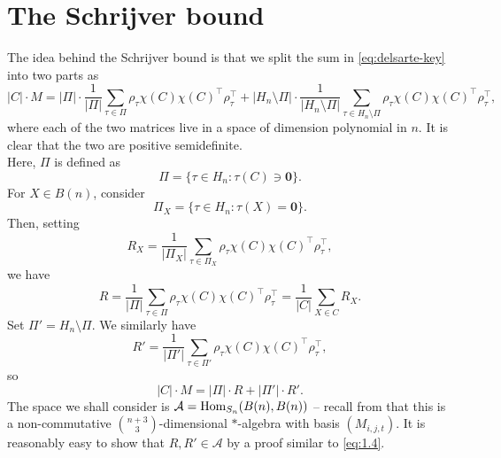\clearpage
\section{The Schrijver bound}
\label{subsec:schrijver}

	The idea behind the Schrijver bound is that we split the sum in \cref{eq:delsarte-key} into two parts as 
	\[ |C| \cdot M = |\Pi| \cdot \frac{1}{|\Pi|} \sum_{\tau \in \Pi} \rho_\tau \chi(C) \chi(C)^\top \rho_\tau^\top + |H_n \setminus \Pi| \cdot \frac{1}{|H_n \setminus \Pi|} \sum_{\tau \in H_n \setminus \Pi} \rho_\tau \chi(C) \chi(C)^\top \rho_\tau^\top, \]
	where each of the two matrices live in a space of dimension polynomial in $n$. It is clear that the two are positive semidefinite.\\
	Here, $\Pi$ is defined as
	\[ \Pi = \{ \tau \in H_n : \tau(C) \ni \mathbf{0} \}. \]
	For $X \in B(n)$, consider
	\[ \Pi_X = \{ \tau \in H_n : \tau(X) = \mathbf{0} \}. \]
	Then, setting 
	\[ R_X = \frac{1}{|\Pi_X|} \sum_{\tau \in \Pi_X} \rho_{\tau} \chi(C) \chi(C)^\top \rho_\tau^\top, \]
	we have
	\[ R = \frac{1}{|\Pi|} \sum_{\tau \in \Pi} \rho_{\tau} \chi(C) \chi(C)^\top \rho_\tau^\top = \frac{1}{|C|} \sum_{X \in C} R_X. \]
	Set $\Pi' = H_n \setminus \Pi$. We similarly have
	\[ R' = \frac{1}{|\Pi'|} \sum_{\tau \in \Pi'} \rho_{\tau} \chi(C) \chi(C)^\top \rho_\tau^\top, \]
	so
	\[ |C|\cdot M = |\Pi| \cdot R + |\Pi'| \cdot R'. \]
	The space we shall consider is $\mathcal{A} = \operatorname{Hom}_{S_n}(B(n),B(n))$ -- recall from  that this is a non-commutative $\binom{n+3}{3}$-dimensional $*$-algebra with basis $(M_{i,j,t})$. It is reasonably easy to show that $R,R' \in \mathcal{A}$ by a proof similar to \cref{eq:1.4}.

